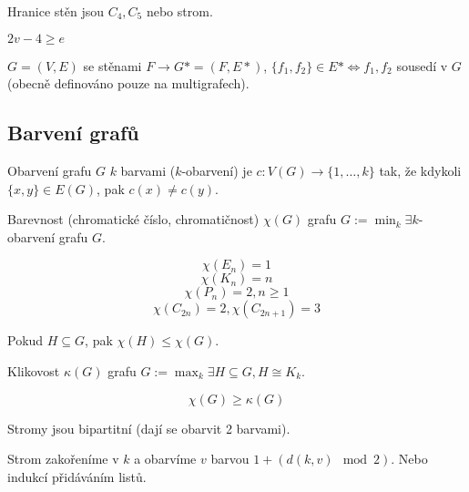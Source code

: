 \documentclass[12pt]{article}					%
\begin{document}
        \begin{poznamka}
            Hranice stěn jsou $C_4, C_5$ nebo strom.

            $2v-4 ≥ e$
        \end{poznamka}

        \begin{definice}
            $G = (V, E)$ se stěnami $F \rightarrow G*=(F, E*)$, $\{f_1, f_2\} \in E* \Leftrightarrow f_1, f_2$ sousedí v $G$ (obecně definováno pouze na multigrafech).
        \end{definice}

    \subsection{Barvení grafů}
        \begin{definice}
            Obarvení grafu $G$ $k$ barvami ($k$-obarvení) je $c: V(G) \rightarrow \{1, …, k\}$ tak, že kdykoli $\{x, y\} \in E(G)$, pak $c(x)≠c(y)$.

            Barevnost (chromatické číslo, chromatičnost) $\chi(G)$ grafu $G := \min_k \exists k$-obarvení grafu $G$.
        \end{definice}

        \begin{priklady}
            $$ \chi(E_n) = 1 $$ 
            $$ \chi(K_n) = n $$
            $$ \chi(P_n)=2, n≥1 $$
            $$ \chi(C_{2n}) = 2, \chi(C_{2n+1}) = 3 $$ 
        \end{priklady}

        \begin{poznamka}[Pozorování]
            Pokud $H \subseteq G$, pak $\chi(H)≤\chi(G)$.
        \end{poznamka}

        \begin{definice}[Klikovost]
            Klikovost $\kappa(G)$ grafu $G := \max_k \exists H \subseteq G, H \cong K_k$.
        \end{definice}

        \begin{poznamka}[Pozorování]
            $$ \chi(G) ≥ \kappa(G) $$
        \end{poznamka}

        \begin{lemma}[Pozorování]
            Stromy jsou bipartitní (dají se obarvit 2 barvami).
            \begin{dukazin}
                Strom zakořeníme v $k$ a obarvíme $v$ barvou $1+(d(k, v) \mod 2)$. Nebo indukcí přidáváním listů.
            \end{dukazin}
        \end{lemma}
\end{document}
